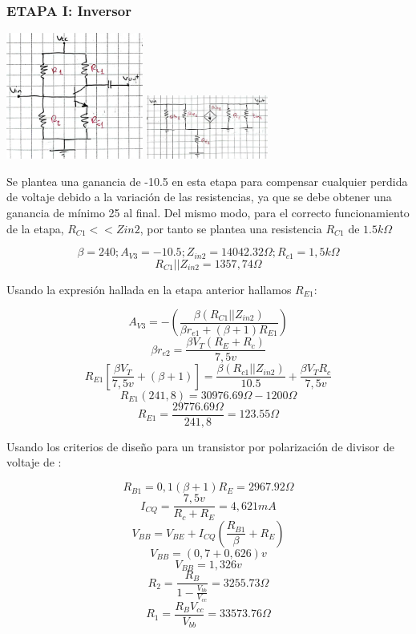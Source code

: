 \documentclass[conference]{IEEEtran}
\begin{document}
\subsubsection{ETAPA I: Inversor}

\includegraphics[width=4.5cm]{imagenes/etapa1.PNG}
\includegraphics[width=4cm]{imagenes/etapa1.1.PNG}

\begin{center}

Se plantea una ganancia de -10.5 en esta etapa para compensar cualquier perdida de voltaje debido a la variación de las resistencias, ya que se debe obtener una ganancia de mínimo 25 al final. Del mismo modo, para el correcto funcionamiento de la etapa, $R_{C1}<<Z{in2}$, por tanto se plantea una resistencia $R_{C1}$ de $1.5k\Omega$

\[\beta =240; A_{V3}=-10.5 ; Z_{in2}=14042.32\Omega ; R_{c1}=1,5k\Omega \]
\[R_{C1}||Z_{in2}=1357,74\Omega\]

Usando la expresión hallada en la etapa anterior hallamos $R_{E1}$:

\[A_{V3}=-(\frac{\beta(R_{C1}||Z_{in2})}{\beta r_{e1}+(\beta +1)R_{E1}})\]
\[\beta r_{e2}= \frac{\beta V_{T}(R_{E}+R_{c})}{7,5v}\]
\[R_{E1}[\frac{\beta V_{T}}{7,5v}+(\beta+1)]=\frac{\beta(R_{c1}||Z_{in2})}{10.5}+ \frac{\beta V_{T} R_{c}}{7,5v}\]
\[R_{E1}(241,8)=30976.69\Omega - 1200\Omega\]
\[R_{E1}= \frac{29776.69\Omega}{241,8}=123.55\Omega\]

Usando los criterios de diseño para un transistor por polarización de divisor de voltaje de \cite{neamen2009microelectronics}:

\[R_{B1}=0,1(\beta +1) R_{E}=2967.92\Omega\]
\[I_{CQ}= \frac{7,5v}{R_{c}+R_{E}}=4,621mA\]
\[V_{BB}=V_{BE}+I_{CQ}(\frac{R_{B1}}{\beta}+R_{E})\]
\[V_{BB}=(0,7+0,626)v\]
\[V_{BB}=1,326v\]
\[R_{2}= \frac{R_{B}}{1- \frac{V_{bb}}{V_{cc}}}=3255.73\Omega\]
\[R_{1}=\frac{R_{B} V_{cc}}{V_{bb}}=33573.76\Omega\]


\end{center}
\end{document}
